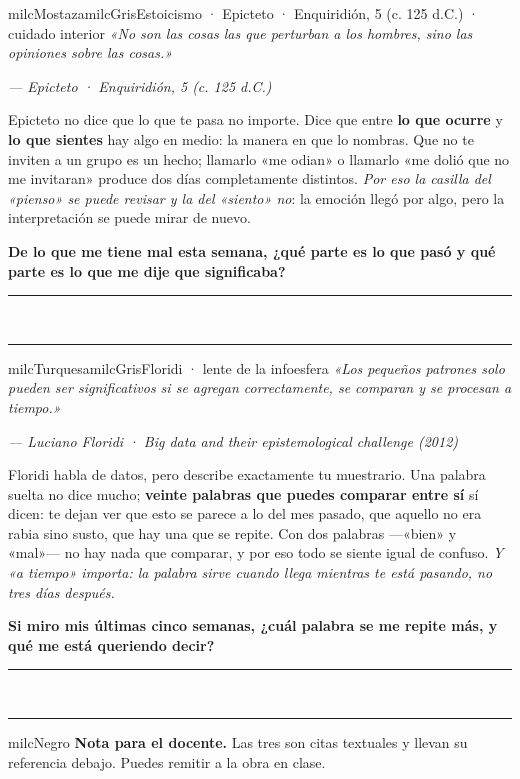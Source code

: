 \documentclass[11pt,letterpaper]{article}
\newcommand{\linead}[1]{\noindent\color{milcLinea}\rule{#1}{0.5pt}\color{milcNegro}}
\begin{document}
\begin{softbox}{milcMostaza}{milcGris}{Estoicismo · Epicteto · Enquiridión, 5 (c. 125 d.C.) · cuidado interior}
\textit{«No son las cosas las que perturban a los hombres, sino las opiniones sobre las cosas.»}

{\footnotesize\itshape\color{milcNegro!70}--- Epicteto · Enquiridión, 5 (c. 125 d.C.)}

Epicteto no dice que lo que te pasa no importe. Dice que entre \textbf{lo que ocurre} y \textbf{lo que sientes} hay algo en medio: la manera en que lo nombras. Que no te inviten a un grupo es un hecho; llamarlo «me odian» o llamarlo «me dolió que no me invitaran» produce dos días completamente distintos. \emph{Por eso la casilla del «pienso» se puede revisar y la del «siento» no}: la emoción llegó por algo, pero la interpretación se puede mirar de nuevo.

\textbf{De lo que me tiene mal esta semana, ¿qué parte es lo que pasó y qué parte es lo que me dije que significaba?}
\end{softbox}
\linead{\linewidth}\\[1mm]
\linead{\linewidth}

\begin{softbox}{milcTurquesa}{milcGris}{Floridi · lente de la infoesfera}
\textit{«Los pequeños patrones solo pueden ser significativos si se agregan correctamente, se comparan y se procesan a tiempo.»}

{\footnotesize\itshape\color{milcNegro!70}--- Luciano Floridi · Big data and their epistemological challenge (2012)}

Floridi habla de datos, pero describe exactamente tu muestrario. Una palabra suelta no dice mucho; \textbf{veinte palabras que puedes comparar entre sí} sí dicen: te dejan ver que esto se parece a lo del mes pasado, que aquello no era rabia sino susto, que hay una que se repite. Con dos palabras ---«bien» y «mal»--- no hay nada que comparar, y por eso todo se siente igual de confuso. \emph{Y «a tiempo» importa: la palabra sirve cuando llega mientras te está pasando, no tres días después.}

\textbf{Si miro mis últimas cinco semanas, ¿cuál palabra se me repite más, y qué me está queriendo decir?}
\end{softbox}
\linead{\linewidth}\\[1mm]
\linead{\linewidth}

\begin{infoband}{milcNegro}
\textbf{Nota para el docente.} Las tres son citas textuales y llevan su referencia debajo. Puedes remitir a la obra en clase.
\end{infoband}
\end{document}
